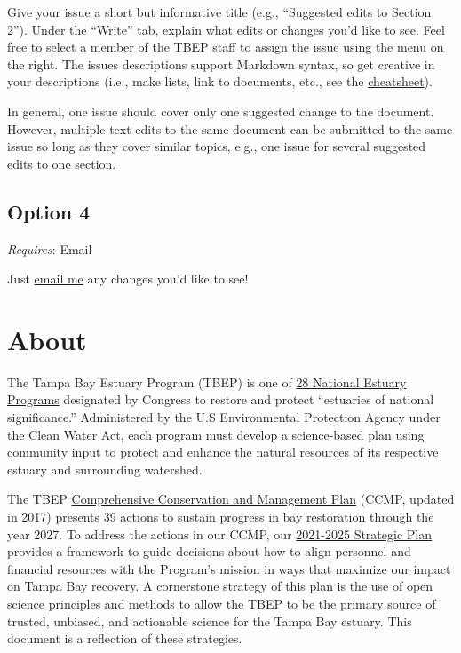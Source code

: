 \documentclass[
]{book}
\begin{document}
Give your issue a short but informative title (e.g., ``Suggested edits to Section 2''). Under the ``Write'' tab, explain what edits or changes you'd like to see. Feel free to select a member of the TBEP staff to assign the issue using the menu on the right. The issues descriptions support Markdown syntax, so get creative in your descriptions (i.e., make lists, link to documents, etc., see the \href{https://rstudio.com/wp-content/uploads/2015/03/rmarkdown-reference.pdf}{cheatsheet}).

In general, one issue should cover only one suggested change to the document. However, multiple text edits to the same document can be submitted to the same issue so long as they cover similar topics, e.g., one issue for several suggested edits to one section.

\subsection{Option 4}\label{opt4}

\emph{Requires}: Email

Just \href{mailto:mbeck@tbep.org}{email me} any changes you'd like to see!

\section{About}\label{about}

The Tampa Bay Estuary Program (TBEP) is one of \href{http://nationalestuaries.org/}{28 National Estuary Programs} designated by Congress to restore and protect ``estuaries of national significance.'' Administered by the U.S Environmental Protection Agency under the Clean Water Act, each program must develop a science-based plan using community input to protect and enhance the natural resources of its respective estuary and surrounding watershed.

The TBEP \href{http://ccmp.tbep.org/}{Comprehensive Conservation and Management Plan} (CCMP, updated in 2017) presents 39 actions to sustain progress in bay restoration through the year 2027. To address the actions in our CCMP, our \href{https://drive.google.com/file/d/11xohuoaHDxNHRqgXoOHdI37FpWvac_rn/view}{2021-2025 Strategic Plan} provides a framework to guide decisions about how to align personnel and financial resources with the Program's mission in ways that maximize our impact on Tampa Bay recovery. A cornerstone strategy of this plan is the use of open science principles and methods to allow the TBEP to be the primary source of trusted, unbiased, and actionable science for the Tampa Bay estuary. This document is a reflection of these strategies.
\end{document}
